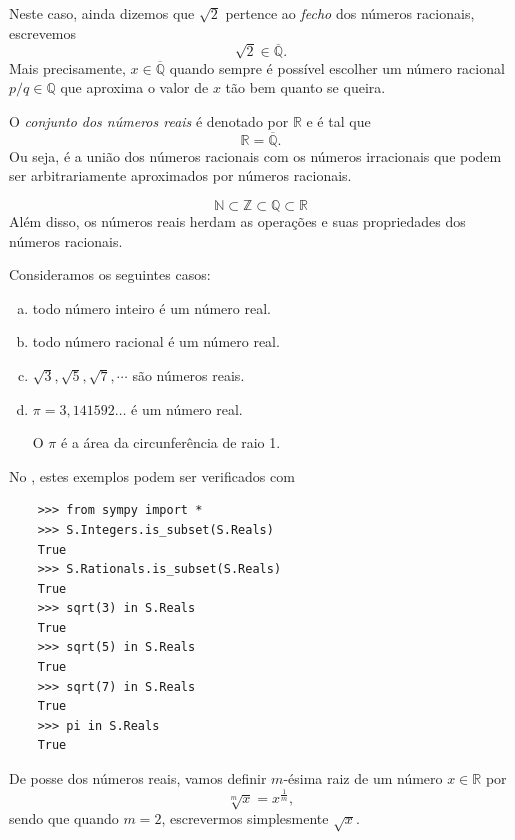 Neste caso, ainda dizemos que $\sqrt{2}$ pertence ao \emph{fecho} dos números racionais, escrevemos
\begin{equation}
  \sqrt{2}\in\overline{\mathbb{Q}}.
\end{equation}
Mais precisamente, $x\in\overline{\mathbb{Q}}$ quando sempre é possível escolher um número racional $p/q\in\mathbb{Q}$ que aproxima o valor de $x$ tão bem quanto se queira.

O \emph{conjunto dos números reais} é denotado por $\mathbb{R}$ e é tal que
\begin{equation}
  \mathbb{R} = \overline{\mathbb{Q}}.
\end{equation}
Ou seja, é a união dos números racionais com os números irracionais que podem ser arbitrariamente aproximados por números racionais.

\begin{obs}
  \begin{equation}
    \mathbb{N}\subset\mathbb{Z}\subset\mathbb{Q}\subset\mathbb{R}
  \end{equation}
  Além disso, os números reais herdam as operações e suas propriedades dos números racionais.
\end{obs}

\begin{ex}
  Consideramos os seguintes casos:
  \begin{enumerate}[a)]
  \item todo número inteiro é um número real.
  \item todo número racional é um número real.
  \item $\sqrt{3}, \sqrt{5}, \sqrt{7}, \cdots$ são números reais.
  \item $\pi = 3,141592\ldots$ é um número real.

    O $\pi$ é a área da circunferência de raio 1.
  \end{enumerate}

  \ifispython
  No \python, estes exemplos podem ser verificados com
  \begin{lstlisting}
    >>> from sympy import *
    >>> S.Integers.is_subset(S.Reals)
    True
    >>> S.Rationals.is_subset(S.Reals)
    True
    >>> sqrt(3) in S.Reals
    True
    >>> sqrt(5) in S.Reals
    True
    >>> sqrt(7) in S.Reals
    True
    >>> pi in S.Reals
    True
  \end{lstlisting}
  \fi
\end{ex}

De posse dos números reais, vamos definir $m$-ésima raiz de um número $x\in\mathbb{R}$ por
\begin{equation}
  \sqrt[m]{x} = x^{\frac{1}{m}},
\end{equation}
sendo que quando $m=2$, escrevermos simplesmente $\sqrt{x}$.

